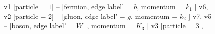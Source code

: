 \documentclass{revtex4}
\begin{document}
\begin{figure}[!htb]
\begin{center}
{    %
v1 [particle = \(1\)] -- [fermion, edge label' = \(b\), momentum = \(k_{1}\) ] v6, 
v2 [particle = \(2\)] -- [gluon, edge label' = \(g\), momentum = \(k_{2}\) ] v7, 
v5 -- [boson, edge label' = \(W^{-}\), momentum = \(K_{3}\) ] v3 [particle = \(3\)], 
}
\end{center}
\end{figure}
\end{document}
